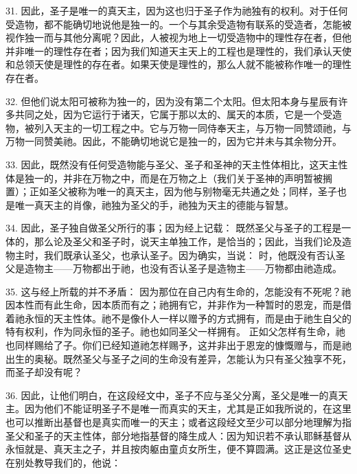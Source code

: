 31. 因此，圣子是唯一的真天主，因为这也归于圣子作为祂独有的权利。对于任何受造物，都不能确切地说他是独一的。一个与其余受造物有联系的受造者，怎能被视作独一而与其他分离呢？因此，人被视为地上一切受造物中的理性存在者，但他并非唯一的理性存在者；因为我们知道天主天上的工程也是理性的，我们承认天使和总领天使是理性的存在者。如果天使是理性的，那么人就不能被称作唯一的理性存在者。\par

32. 但他们说太阳可被称为独一的，因为没有第二个太阳。但太阳本身与星辰有许多共同之处，因为它运行于诸天，它属于那以太的、属天的本质，它是一个受造物，被列入天主的一切工程之中。它与万物一同侍奉天主，与万物一同赞颂祂，与万物一同赞美祂。因此，不能确切地说它是独一的，因为它并未与其余物分开。\par

33. 因此，既然没有任何受造物能与圣父、圣子和圣神的天主性体相比，这天主性体是独一的，并非在万物之中，而是在万物之上（我们关于圣神的声明暂被搁置）；正如圣父被称为唯一的真天主，因为他与别物毫无共通之处；同样，圣子也是唯一真天主的肖像，祂独为圣父的手，祂独为天主的德能与智慧。\par

34. 因此，圣子独自做圣父所行的事；因为经上记载： 既然圣父与圣子的工程是一体的，那么论及圣父和圣子时，说天主单独工作，是恰当的；因此，当我们论及造物主时，我们既承认圣父，也承认圣子。因为确实，当说： 时，他既没有否认圣父是造物主——万物都出于祂，也没有否认圣子是造物主——万物都由祂造成。\par

35. 这与经上所载的并不矛盾： 因为那位在自己内有生命的，怎能没有不死呢？祂因本性而有此生命，因本质而有之；祂拥有它，并非作为一种暂时的恩宠，而是借着祂永恒的天主性体。祂不是像仆人一样以赠予的方式拥有，而是由于祂生自父的特有权利，作为同永恒的圣子。祂也如同圣父一样拥有。 正如父怎样有生命，祂也同样赐给了子。你们已经知道祂怎样赐予，这并非出于恩宠的慷慨赠与，而是祂出生的奥秘。既然圣父与圣子之间的生命没有差异，怎能认为只有圣父独享不死，而圣子却没有呢？\par

36. 因此，让他们明白，在这段经文中，圣子不应与圣父分离，圣父是唯一的真天主。因为他们不能证明圣子不是唯一而真实的天主，尤其是正如我所说的，在这里也可以推断出基督也是真实而唯一的天主；或者这段经文至少可以部分地理解为指圣父和圣子的天主性体，部分地指基督的降生成人：因为知识若不承认耶稣基督从永恒就是、真天主之子，并且按肉躯由童贞女所生，便不算圆满。这正是这位圣史在别处教导我们的，他说：\par

